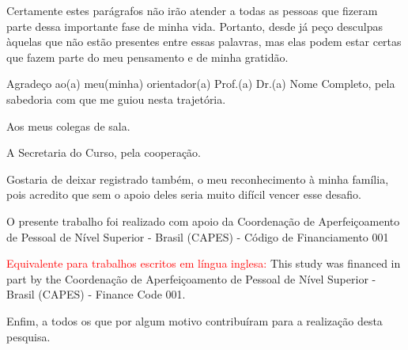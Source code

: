 
\begin{agradecimentos}%

Certamente estes parágrafos não irão atender a todas as pessoas que fizeram parte dessa importante fase de minha vida. Portanto, desde já peço desculpas àquelas que não estão presentes entre essas palavras, mas elas podem estar certas que fazem parte do meu pensamento e de minha gratidão. 

Agradeço ao(a) meu(minha) orientador(a) Prof.(a) Dr.(a) Nome Completo, pela sabedoria com que me guiou nesta trajetória.

Aos meus colegas de sala.

A Secretaria do Curso, pela cooperação.

Gostaria de deixar registrado também, o meu reconhecimento à minha família, pois acredito que sem o apoio deles seria muito difícil vencer esse desafio. 

O presente trabalho foi realizado com apoio da Coordenação de Aperfeiçoamento de Pessoal de Nível Superior - Brasil (CAPES) - Código de Financiamento 001

\textcolor{red}{Equivalente para trabalhos escritos em língua inglesa:} This study was financed in part by the Coordenação de Aperfeiçoamento de Pessoal de Nível Superior - Brasil (CAPES) - Finance Code 001.

Enfim, a todos os que por algum motivo contribuíram para a realização desta pesquisa.



\end{agradecimentos}
